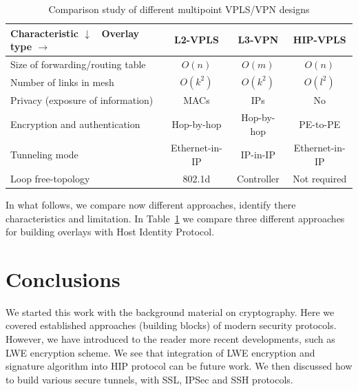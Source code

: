 \begin{table}
    \small
    \begin{tabular}{|l|c|c|c|}
    \hline
    Characteristic $\downarrow$ \ Overlay type $\rightarrow$ & L2-VPLS & L3-VPN & HIP-VPLS \\\hline
    Size of forwarding/routing table & $O(n)$ & $O(m)$ & $O(n)$\\\hline
    Number of links in mesh & $O(k^2)$ & $O(k^2)$ & $O(l^2)$ \\\hline
    Privacy (exposure of information) & MACs & IPs & No \\\hline
    Encryption and authentication & Hop-by-hop & Hop-by-hop & PE-to-PE \\\hline
    Tunneling mode & Ethernet-in-IP & IP-in-IP & Ethernet-in-IP \\\hline
    Loop free-topology & 802.1d & Controller & Not required \\\hline
    \end{tabular}
    \label{analysis}
    \caption {Comparison study of different multipoint VPLS/VPN designs}
\end{table}

In what follows, we compare now different approaches, identify there
characteristics and limitation. In Table~\ref{analysis} we 
compare three different approaches for building overlays with Host 
Identity Protocol. 

\chapter{Conclusions}

We started this work with the background material on cryptography. Here we covered
established approaches (building blocks) of modern security protocols. However, we 
have introduced to the reader more recent developments, such as LWE encryption scheme.
We see that integration of LWE encryption and signature algorithm into HIP protocol 
can be future work. We then discussed how to build various secure tunnels, \eg with 
SSL, IPSec and SSH protocols. 


